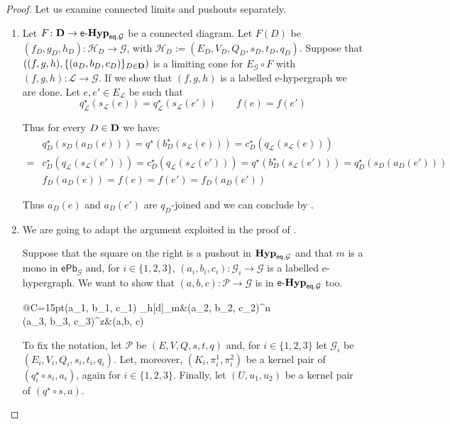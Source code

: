 \documentclass[3p]{elsarticle}
\newcommand{\pbe}{\mathsf{ePb}}
\newcommand{\eq}{\mathsf{eq}}
\def\D{\textbf {\textup{D}}}
\newcommand{\catname}[1]{\textbf{\textup{#1}}}
\newcommand{\hyp}{\catname{Hyp}}
\newcommand{\eggl}{\mathsf{e}\text{-}\catname{Hyp}_{\eq, \mathcal{G}}}
\theoremstyle{remark}
\theoremstyle{definition}
\begin{document}
\varie*


\begin{proof}\label{proof:varie}
	Let us examine connected limits and pushouts separately.
	\begin{enumerate}
		\item Let $F\colon \D\to \eggl$ be a connected diagram. Let $F(D)$ be $(f_D,g_D,h_D)\colon \mathcal{H}_D\to \mathcal{G}$, with $ \mathcal{H}_D:=(E_D, V_D, Q_D, s_D, t_D, q_D)$. Suppose that $((f,g,h), \{(a_D, b_D, c_D)\}_{D\in \D})$ is a limiting cone for $E_{\mathcal{G}}\circ F$ with $(f,g,h)\colon \mathcal{L}\to \mathcal{G}$. If we show that $(f,g,h)$ is a labelled e-hypergraph we are done. Let $e, e'\in E_{\mathcal{L}}$ be such that
		\[q^\star_{\mathcal{L}}(s_{\mathcal{L}}(e))=q^\star_{\mathcal{L}}(s_{\mathcal{L}}(e')) \qquad f(e)=f(e')\]
		
		 Thus for every $D\in \D$ we have:
		\begin{align*}
			&q^\star_D(s_D(a_D(e)))=q^\star(b^\star_D(s_{\mathcal{L}}(e)))=c^\star_D(q_{\mathcal{L}}(s_{\mathcal{L}}(e)))\\=&c^\star_D(q_{\mathcal{L}}(s_{\mathcal{L}}(e')))=c^\star_D(q_{\mathcal{L}}(s_{\mathcal{L}}(e')))=q^\star(b^\star_D(s_{\mathcal{L}}(e')))=q^\star_D(s_D(a_D(e')))\\
			&f_D(a_D(e)) = f(e)=f(e')= f_D(a_D(e'))
		\end{align*}
		
		Thus $a_D(e)$ and $a_D(e')$ are $q_D$-joined and we can conclude by .
		\item We are going to adapt the argument exploited in the proof of .
		
		\noindent 
		\begin{minipage}[l]{.73\linewidth}
				Suppose that the square on the right is a pushout in $\hyp_{\eq, \mathcal{G}}$ and that $m$ is a mono in $\pbe_{\mathcal{G}}$ and, for $i\in \{1,2,3\}$, $(a_i,b_i,c_i)\colon \mathcal{G}_i\to \mathcal{G}$ is a labelled e-hypergraph. We want to show that $(a,b,c)\colon \mathcal{P}\to \mathcal{G}$ is in $\eggl$ too.
		\end{minipage}\hfill 
		\begin{minipage}[r]{.15\linewidth}
			\xymatrix@R=10pt@C=15pt{(a_1, b_1, c_1) \ar[r]_{h}\ar@{>->}[d]_{m}&(a_2, b_2, c_2)\ar[d]^{n}\\(a_3, b_3, c_3)\ar[r]^{z}&(a,b, c)}
		\end{minipage}
		

		To fix the notation, let $\mathcal{P} $ be $(E, V, Q, s, t, q)$ and, for $i\in \{1, 2, 3\}$ let $\mathcal{G}_i$ be $(E_{i}, V_i, Q_i, s_i, t_i, q_i)$.  Let, moreover, $(K_i, \pi_i^1, \pi_i^2)$
		be a kernel pair of $(q_i^\star \circ s_i, a_i)$, again for $i\in \{1, 2, 3\}$. Finally, let $(U, u_1, u_2)$ be a kernel pair of $(q^\star \circ s, a)$. 
		

\end{enumerate}
\end{proof}
\end{document}
